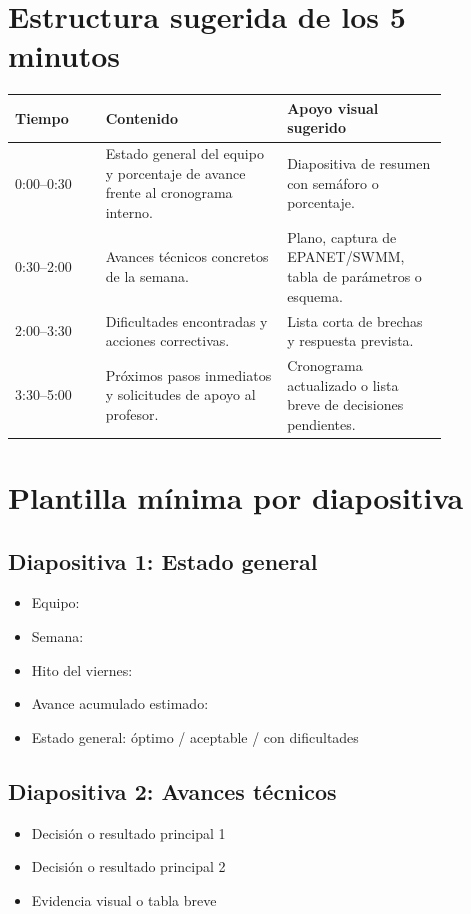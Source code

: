 \documentclass[11pt]{article}
\begin{document}
\section{Estructura sugerida de los 5 minutos}
\begin{center}
\begin{tabular}{p{0.18\linewidth} p{0.36\linewidth} p{0.32\linewidth}}
\toprule
\textbf{Tiempo} & \textbf{Contenido} & \textbf{Apoyo visual sugerido} \\
\midrule
0:00--0:30 & Estado general del equipo y porcentaje de avance frente al cronograma interno. & Diapositiva de resumen con sem\'aforo o porcentaje. \\
0:30--2:00 & Avances t\'ecnicos concretos de la semana. & Plano, captura de EPANET/SWMM, tabla de par\'ametros o esquema. \\
2:00--3:30 & Dificultades encontradas y acciones correctivas. & Lista corta de brechas y respuesta prevista. \\
3:30--5:00 & Pr\'oximos pasos inmediatos y solicitudes de apoyo al profesor. & Cronograma actualizado o lista breve de decisiones pendientes. \\
\bottomrule
\end{tabular}
\end{center}

\section{Plantilla m\'inima por diapositiva}
\subsection*{Diapositiva 1: Estado general}
\begin{itemize}
\item Equipo:
\item Semana:
\item Hito del viernes:
\item Avance acumulado estimado:
\item Estado general: \'optimo / aceptable / con dificultades
\end{itemize}

\subsection*{Diapositiva 2: Avances t\'ecnicos}
\begin{itemize}
\item Decisi\'on o resultado principal 1
\item Decisi\'on o resultado principal 2
\item Evidencia visual o tabla breve
\end{itemize}
\end{document}
